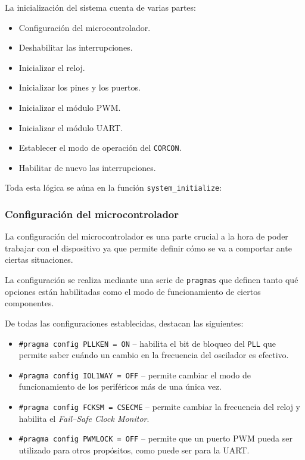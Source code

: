 La inicialización del sistema cuenta de varias partes:
\begin{itemize}
    \item Configuración del microcontrolador.
    \item Deshabilitar las interrupciones.
    \item Inicializar el reloj.
    \item Inicializar los pines y los puertos.
    \item Inicializar el módulo \ac{PWM}.
    \item Inicializar el módulo \ac{UART}.
    \item Establecer el modo de operación del \texttt{CORCON}.
    \item Habilitar de nuevo las interrupciones.
\end{itemize}

Toda esta lógica se aúna en la función \texttt{system\_initialize}:



\subsubsection{Configuración del microcontrolador}
La configuración del microcontrolador es una parte crucial a la hora de poder
trabajar con el dispositivo ya que permite definir cómo se va a comportar ante
ciertas situaciones.

La configuración se realiza mediante una serie de \texttt{pragmas} que definen
tanto qué opciones están habilitadas como el modo de funcionamiento de ciertos
componentes.

De todas las configuraciones establecidas, destacan las siguientes:

\begin{itemize}
    \item \lstinline[style=C]{#pragma config PLLKEN = ON} -- habilita el bit de bloqueo
    del \texttt{PLL} que permite saber cuándo un cambio en la frecuencia del oscilador
    es efectivo.
    \item \lstinline[style=C]{#pragma config IOL1WAY = OFF} -- permite cambiar el modo
    de funcionamiento de los periféricos más de una única vez.
    \item \lstinline[style=C]{#pragma config FCKSM = CSECME} -- permite cambiar la
    frecuencia del reloj y habilita el \textit{Fail--Safe Clock Monitor}.
    \item \lstinline[style=C]{#pragma config PWMLOCK = OFF} -- permite que un puerto
    \ac{PWM} pueda ser utilizado para otros propósitos, como puede ser para la \ac{UART}.
\end{itemize}

